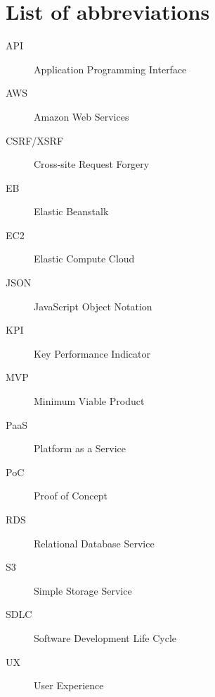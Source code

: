 \chapter{List of abbreviations}

\begin{description}
		\item[API] Application Programming Interface
		\item[AWS] Amazon Web Services
		\item[CSRF/XSRF] Cross-site Request Forgery
		\item[EB] Elastic Beanstalk
		\item[EC2] Elastic Compute Cloud
		\item[JSON] JavaScript Object Notation
		\item[KPI] Key Performance Indicator
		\item[MVP] Minimum Viable Product
		\item[PaaS] Platform as a Service
		\item[PoC] Proof of Concept
		\item[RDS] Relational Database Service
		\item[S3] Simple Storage Service
		\item[SDLC] Software Development Life Cycle
		\item[UX] User Experience
\end{description}
	